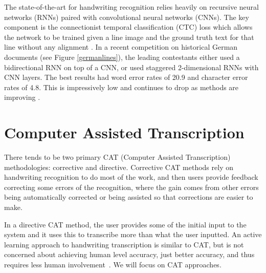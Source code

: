 \documentclass[ms,electronic,twosidetoc,letterpaper,chaptercenter,parttop,lol,lof,lot]{byumsphd}
\begin{document}
The state-of-the-art for handwriting recognition relies heavily on recursive neural networks (RNNs) paired with convolutional neural networks (CNNs). The key component is the connectionist temporal classification (CTC) loss which allows the network to be trained given a line image and the ground truth text for that line without any alignment \cite{CTC}. In a recent competition on historical German documents \cite{icfhrComp2016} (see Figure \ref{germanlines}), the leading contestants either used a bidirectional RNN on top of a CNN, or used staggered 2-dimensional RNNs with CNN layers. The best results had word error rates of 20.9 and character error rates of 4.8. This is impressively low and continues to drop as methods are improving \cite{wigington2017}.



\section{Computer Assisted Transcription} %

There tends to be two primary CAT (Computer Assisted Transcription) methodologies: corrective and directive. Corrective CAT methods rely on handwriting recognition to do most of the work, and then users provide feedback correcting some errors of the recognition, where the gain comes from other errors being automatically corrected or being assisted so that corrections are easier to make.

In a directive CAT method, the user provides some of the initial input to the system and it uses this to transcribe more than what the user inputted.
An active learning approach to handwriting transcription is similar to CAT, but is not concerned about achieving human level accuracy, just better accuracy, and thus requires less human involvement~\cite{Serrano2010}. 
We will focus on CAT approaches.
\end{document}

